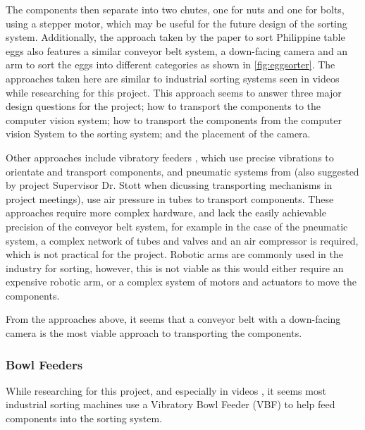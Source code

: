 The components then separate into two chutes, one for nuts and one for bolts, using a stepper motor, which may be useful for the future design of the sorting system. Additionally, the approach taken by the paper \citet{eggsorting} to sort Philippine table eggs also features a similar conveyor belt system, a down-facing camera and an arm to sort the eggs into different categories as shown in \autoref{fig:eggsorter}. The approaches taken here are similar to industrial sorting systems seen in videos while researching for this project. This approach seems to answer three major design questions for the project; how to transport the components to the computer vision system; how to transport the components from the computer vision System to the sorting system; and the placement of the camera.

Other approaches include vibratory feeders \cite{s21217280}, which use precise vibrations to orientate and transport components, and pneumatic systems from \citet{ASEC2023-16267} (also suggested by project Supervisor Dr. Stott when dicussing transporting mechanisms in project meetings), use air pressure in tubes to transport components. These approaches require more complex hardware, and lack the easily achievable precision of the conveyor belt system, for example in the case of the pneumatic system, a complex network of tubes and valves and an air compressor is required, which is not practical for the project. Robotic arms are commonly used in the industry for sorting, however, this is not viable as this would either require an expensive robotic arm, or a complex system of motors and actuators to move the components.

From the approaches above, it seems that a conveyor belt with a down-facing camera is the most viable approach to transporting the components.
\subsubsection{Bowl Feeders}
While researching for this project, and especially in videos \cite{videobowlfeeder}, it seems most industrial sorting machines use a Vibratory Bowl Feeder (VBF) to help feed components into the sorting system.

